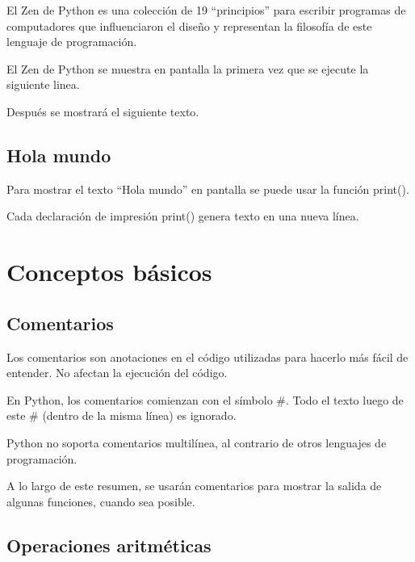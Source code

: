 \documentclass{report}
\newcommand{\doble}[1]{``#1''}
\begin{document}
El Zen de Python es una colección de 19 \doble{principios} para escribir programas de computadores que influenciaron el diseño y representan la filosofía de este lenguaje de programación.

El Zen de Python se muestra en pantalla la primera vez que se ejecute la siguiente linea.


Después se mostrará el siguiente texto.


\section{Hola mundo}

Para mostrar el texto \doble{Hola mundo} en pantalla se puede usar la función print().


Cada declaración de impresión print() genera texto en una nueva línea.


\clearpage\chapter{Conceptos básicos}

\section{Comentarios}

Los comentarios son anotaciones en el código utilizadas para hacerlo más fácil de entender. No afectan la ejecución del código.

En Python, los comentarios comienzan con el símbolo \#. Todo el texto luego de este \# (dentro de la misma línea) es ignorado.


Python no soporta comentarios multilínea, al contrario de otros lenguajes de programación.

A lo largo de este resumen, se usarán comentarios para mostrar la salida de algunas funciones, cuando sea posible.

\section{Operaciones aritméticas}
\end{document}
